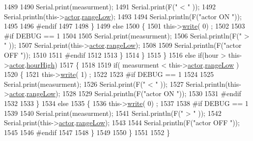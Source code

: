 \begin{DoxyCode}
1489 
1490                 Serial.print(measurment);
1491                 Serial.print(F(\textcolor{stringliteral}{" < "} ));
1492                 Serial.println(this->\hyperlink{class_cool_board_actor_a8f190db9f7a39fddbcef7f152da970e9}{actor}.\hyperlink{struct_cool_board_actor_1_1state_a43f891c9fb3bb63575c27cec860de55a}{rangeLow});
1493 
1494                 Serial.println(F(\textcolor{stringliteral}{"actor ON "}));
1495 
1496 \textcolor{preprocessor}{            #endif  }
1497 
1498             \}
1499             \textcolor{keywordflow}{else} 
1500             \{
1501                 this->\hyperlink{class_cool_board_actor_a958786ff01ea1056ee72c72d439f86da}{write}( 0) ;
1502 
1503 \textcolor{preprocessor}{            #if DEBUG == 1 }
1504 
1505                 Serial.print(measurment);
1506                 Serial.println(F(\textcolor{stringliteral}{" > "} ));
1507                 Serial.print(this->\hyperlink{class_cool_board_actor_a8f190db9f7a39fddbcef7f152da970e9}{actor}.\hyperlink{struct_cool_board_actor_1_1state_a43f891c9fb3bb63575c27cec860de55a}{rangeLow});
1508 
1509                 Serial.println(F(\textcolor{stringliteral}{"actor OFF "}));
1510 
1511 \textcolor{preprocessor}{            #endif  }
1512                 
1513             \}
1514         \}
1515     \}
1516     \textcolor{keywordflow}{else} \textcolor{keywordflow}{if}(hour > this->\hyperlink{class_cool_board_actor_a8f190db9f7a39fddbcef7f152da970e9}{actor}.\hyperlink{struct_cool_board_actor_1_1state_acd1af3ac2382258a5b05497d814adc01}{hourHigh})
1517     \{
1518 
1519         \textcolor{keywordflow}{if}( measurment < this->\hyperlink{class_cool_board_actor_a8f190db9f7a39fddbcef7f152da970e9}{actor}.\hyperlink{struct_cool_board_actor_1_1state_a43f891c9fb3bb63575c27cec860de55a}{rangeLow} )
1520         \{
1521             this->\hyperlink{class_cool_board_actor_a958786ff01ea1056ee72c72d439f86da}{write}( 1) ;
1522 
1523 \textcolor{preprocessor}{        #if DEBUG == 1 }
1524 
1525             Serial.print(measurment);
1526             Serial.print(F(\textcolor{stringliteral}{" < "} ));
1527             Serial.println(this->\hyperlink{class_cool_board_actor_a8f190db9f7a39fddbcef7f152da970e9}{actor}.\hyperlink{struct_cool_board_actor_1_1state_a43f891c9fb3bb63575c27cec860de55a}{rangeLow});
1528 
1529             Serial.println(F(\textcolor{stringliteral}{"actor ON "}));
1530 
1531 \textcolor{preprocessor}{        #endif  }
1532 
1533         \}
1534         \textcolor{keywordflow}{else} 
1535         \{
1536             this->\hyperlink{class_cool_board_actor_a958786ff01ea1056ee72c72d439f86da}{write}( 0) ;
1537 
1538 \textcolor{preprocessor}{        #if DEBUG == 1 }
1539 
1540             Serial.print(measurment);
1541             Serial.println(F(\textcolor{stringliteral}{" > "} ));
1542             Serial.print(this->\hyperlink{class_cool_board_actor_a8f190db9f7a39fddbcef7f152da970e9}{actor}.\hyperlink{struct_cool_board_actor_1_1state_a43f891c9fb3bb63575c27cec860de55a}{rangeLow});
1543 
1544             Serial.println(F(\textcolor{stringliteral}{"actor OFF "}));
1545 
1546 \textcolor{preprocessor}{        #endif  }
1547             
1548         \}
1549     
1550     \}
1551 
1552 \}
\end{DoxyCode}
